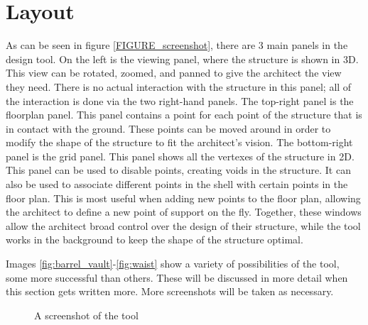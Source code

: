 \documentclass{thesis}
\begin{document}
\section{Layout}
As can be seen in figure \ref{FIGURE_screenshot}, there are 3 main panels in the design tool.  On the left is the viewing panel, where the structure
is shown in 3D.  This view can be rotated, zoomed, and panned to give the architect the view they need.  There is no actual interaction with the
structure in this panel; all of the interaction is done via the two right-hand panels.  The top-right panel is the floorplan panel.  This panel
contains a point for each point of the structure that is in contact with the ground.  These points can be moved around in order to modify the shape
of the structure to fit the architect's vision.  The bottom-right panel is the grid panel.  This panel shows all the vertexes of the structure in 2D.
This panel can be used to disable points, creating voids in the structure.  It can also be used to associate different points in the shell with certain
points in the floor plan.  This is most useful when adding new points to the floor plan, allowing the architect to define a new point of support on the
fly.  Together, these windows allow the architect broad control over the design of their structure, while the tool works in the background to keep the
shape of the structure optimal.

Images \ref{fig:barrel_vault}-\ref{fig:waist} show a variety of possibilities of the tool, some more successful than others.
These will be discussed in more detail when this section gets written more.  More screenshots will be taken as necessary.
\begin{figure}
\caption{A screenshot of the tool}
\label{fig:screenshot}
\end{figure}
\end{document}
